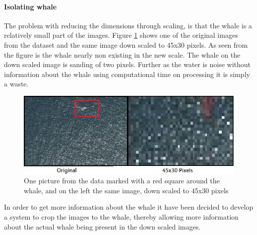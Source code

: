 \paragraph{Isolating whale}
The problem with reducing the dimensions through scaling, is that the whale is a relatively small part of the images. Figure \ref{fig:scale} shows one of the original images from the dataset and the same image down scaled to 45x30 pixels. As seen from the figure is the whale nearly non existing in the new scale. The whale on the down scaled image is sanding of two pixels.  
Further as the water is noise without information about the whale using computational time on processing it is simply a waste.
\begin{figure}
\centering
\includegraphics[scale=0.4]{Images/scale}
\caption{One picture from the data marked with a red square around the whale, and on the left the same image, down scaled to 45x30 pixels}
\label{fig:scale}
\end{figure}

In order to get more information about the whale it have been decided to develop a system to crop the images to the whale, thereby allowing more information about the actual whale being present in the down scaled images.

